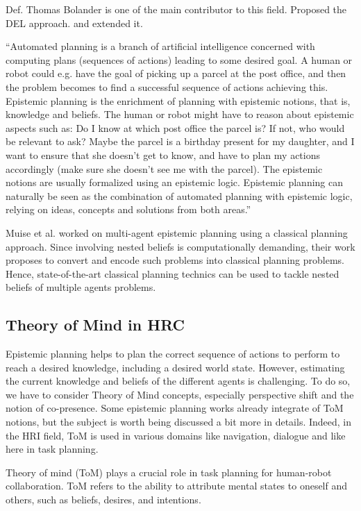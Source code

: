     Def. Thomas Bolander is one of the main contributor to this field. Proposed the DEL approach. \cite{bolander_gentle_2017} and extended it.

    ``Automated planning is a branch of artificial intelligence concerned with computing plans (sequences of actions) leading to some desired goal. A human or robot could e.g. have the goal of picking up a parcel at the post office, and then the problem becomes to find a successful sequence of actions achieving this. Epistemic planning is the enrichment of planning with epistemic notions, that is, knowledge and beliefs. The human or robot might have to reason about epistemic aspects such as: Do I know at which post office the parcel is? If not, who would be relevant to ask? Maybe the parcel is a birthday present for my daughter, and I want to ensure that she doesn't get to know, and have to plan my actions accordingly (make sure she doesn't see me with the parcel). The epistemic notions are usually formalized using an epistemic logic. Epistemic planning can naturally be seen as the combination of automated planning with epistemic logic, relying on ideas, concepts and solutions from both areas.''

    Muise et al. worked on multi-agent epistemic planning using a classical planning approach. Since involving nested beliefs is computationally demanding, their work proposes to convert and encode such problems into classical planning problems. Hence, state-of-the-art classical planning technics can be used to tackle nested beliefs of multiple agents problems. 

    \subsection{Theory of Mind in HRC}
    Epistemic planning helps to plan the correct sequence of actions to perform to reach a desired knowledge, including a desired world state. However, estimating the current knowledge and beliefs of the different agents is challenging. To do so, we have to consider Theory of Mind concepts, especially perspective shift and the notion of co-presence. Some epistemic planning works already integrate of ToM notions, but the subject is worth being discussed a bit more in details. Indeed, in the HRI field, ToM is used in various domains like navigation, dialogue and like here in task planning. 

    Theory of mind (ToM) plays a crucial role in task planning for human-robot collaboration. 
    ToM refers to the ability to attribute mental states to oneself and others, such as beliefs, desires, and intentions. 
    
